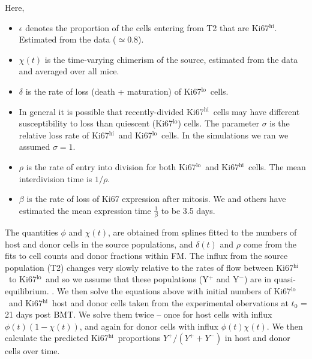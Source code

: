 \documentclass[11pt]{article}
\newcommand{\red}[1]{{\color{red}{#1}}}
\newcommand{\khi}{Ki67$^\text{hi}$}
\newcommand{\klo}{Ki67$^\text{lo}$}
\begin{document}
Here,
\begin{itemize}
\item $\epsilon$ denotes the proportion of the cells entering from T2  that are \khi. Estimated from the data ($\simeq 0.8$).
\item $\chi(t)$ is the time-varying chimerism of the source, estimated from the data and averaged over all mice.
\item $\delta$ is the rate of loss (death + maturation) of \klo\ cells.
\item In general it is possible that recently-divided \khi\ cells may have different susceptibility to loss than quiescent (\klo) cells. The parameter $\sigma$ is the relative loss rate of \khi\ and \klo\ cells. In the simulations we ran we assumed $\sigma=1$.
\item $\rho$ is the rate of entry into division for both \klo\ and \khi\ cells. The mean interdivision time is $1/\rho$.
\item $\beta$ is the rate of loss of Ki67 expression after mitosis.  We and others  have estimated the mean expression time $\frac{1}{\beta}$  to be 3.5 days. 
\end{itemize}

The quantities $\phi$ and  $\chi(t)$,  are obtained from splines fitted to the numbers of host and donor cells in the source populations, and $\delta(t)$ and $\rho$ come from the fits to cell counts and donor fractions within FM. The influx from the source population (T2) changes very slowly relative to the rates of flow between \khi\ to \klo\ and so we assume that these populations (Y$^+$ and Y$^-$) are in quasi-equilibrium. \red{(This means they are locked into the kinetics of the source population and don't slosh around as the influx is changing. Think about being able to keep your balance standing on a moving train -- if it's not too jerky you can keep stably upright because the timescale over which your muscles can respond is pretty quick. If the train accelerates or decelerates fast, you will respond by lurching around a bit before you regain equilibrium)}.  We then solve the equations above with initial numbers of \klo\ and \khi\ host and donor cells taken from the experimental obervations at $t_{0}$ = 21 days post BMT.  We solve them twice -- once for host cells with influx $\phi(t) (1 -\chi(t))$, and again for donor cells with influx $\phi(t) \chi(t)$. We then calculate the predicted \khi\ proportions $Y^{+}/(Y^{+} + Y^{-})$ in host and donor cells over time.
\end{document}
